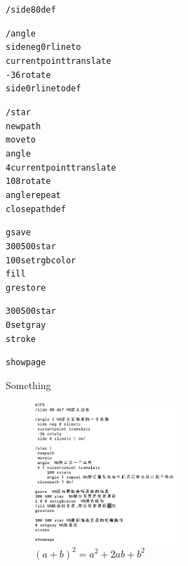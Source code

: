 \documentclass[main.tex]{subfiles}
\begin{document}

\begin{alltt}
/side 80 def %

/angle { %
	side neg 0 rlineto
	currentpoint translate
	-36 rotate
	side 0 rlineto } def

/star {
	newpath
	moveto
	angle  %
	4 { currentpoint translate
		108 rotate
		angle } repeat %
	closepath } def

gsave  %
300 500 star  %
1 0 0 setrgbcolor  %
fill %
grestore

300 500 star %
0 setgray %
stroke

showpage
\end{alltt}

Something
\begin{figure}[h]
	\centering
	\includegraphics[width=0.5\textwidth]{images/star_code.png}
	\caption{$(a+b)^2 = a^2 + 2ab + b^2$}
	\label{fig:III.1.3}
\end{figure}
\end{document}
